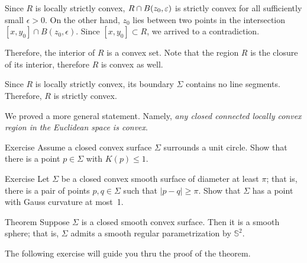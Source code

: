 Since $R$ is locally strictly convex, $R\z\cap B(z_0,\epsilon)$ is strictly convex for all sufficiently small $\epsilon>0$.
On the other hand, $z_0$ lies between two points in the intersection $[x,y_0]\cap B(z_0,\epsilon)$.
Since $[x,y_0]\subset R$, we arrived to a contradiction.

Therefore, the interior of $R$ is a convex set.
Note that the region $R$ is the closure of its interior, therefore $R$ is convex as well.

Since $R$ is locally strictly convex, its boundary $\Sigma$ contains no line segments.
Therefore, $R$ is strictly convex.
\qeds

We proved a more general statement.
Namely, \textit{any closed connected locally convex region in the Euclidean space is convex}.

\begin{thm}{Exercise}\label{ex:surrounds-disc}
Assume a closed convex surface $\Sigma$ surrounds a unit circle.
Show that there is a point  $p \in \Sigma$ with $K(p)\le 1$. 
\end{thm} 

\begin{thm}{Exercise}\label{ex:small-gauss}
Let $\Sigma$ be a closed convex smooth surface of diameter at least $\pi$;
that is, there is a pair of points $p,q\in\Sigma$ such that $|p-q|\ge \pi$.
Show that $\Sigma$ has a point with Gauss curvature at most~1.
\end{thm}

\begin{thm}{Theorem}\label{thm:convex-closed}
Suppose $\Sigma$ is a closed smooth convex surface.
Then it is a smooth sphere; that is, $\Sigma$ admits a smooth regular parametrization by $\mathbb{S}^2$.\end{thm}

The following exercise will guide you thru the proof of the theorem.

